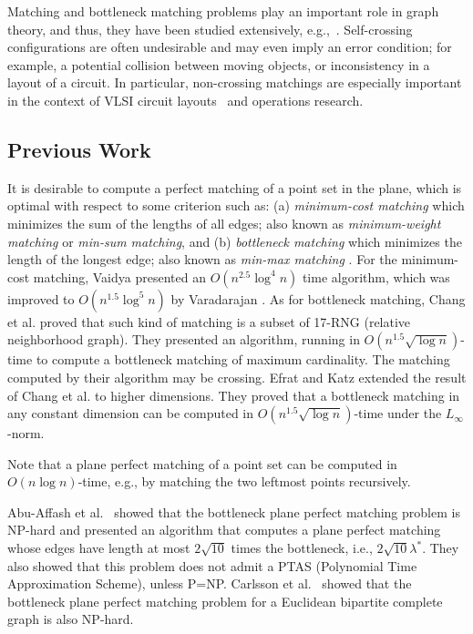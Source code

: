 \documentclass[11pt,a4paper]{article}
\newcommand{\btopt}{\lambda^*}
\begin{document}
Matching and bottleneck matching problems play an important role in graph theory, and thus, they have been studied extensively,  e.g.,~\cite{Abu-Affash2014, Aloupis2013, Chang1992, Efrat2001, Efrat2000, Vaidya1989, Varadarajan1998}. Self-crossing configurations are often undesirable and may even imply an error condition; for example, a potential collision between moving objects, or inconsistency in a layout of a circuit.
In particular, non-crossing matchings are especially important in the context of VLSI circuit layouts~\cite{Lengauer1990} and operations research.


\subsection{Previous Work}

It is desirable to compute a perfect matching of a point set in the plane, which is optimal with respect to some criterion such as: (a) {\em minimum-cost matching} which minimizes the sum of the lengths of all edges; also known as {\em minimum-weight matching} or {\em min-sum matching}, and (b) {\em bottleneck matching} which minimizes the length of the longest edge; also known as {\em min-max matching} \cite{Efrat2000}. For the minimum-cost matching, Vaidya \cite{Vaidya1989} presented an $O(n^{2.5}\log^4 n)$ time algorithm, which was improved to $O(n^{1.5}\log^5 n)$ by Varadarajan \cite{Varadarajan1998}. As for bottleneck matching, Chang et al. \cite{Chang1992} proved that such kind of matching is a subset of 17-RNG (relative neighborhood graph). They presented an algorithm, running in $O(n^{1.5}\sqrt{\log n})$-time to compute a bottleneck matching of maximum cardinality. The matching computed by their algorithm may be crossing.
Efrat and Katz \cite{Efrat2000} extended the result of Chang et al. \cite{Chang1992} to higher dimensions. They proved that a bottleneck matching in any constant dimension can be computed in $O(n^{1.5}\sqrt{\log n})$-time under the $L_\infty$-norm. 

Note that a plane perfect matching of a point set can be computed in $O(n\log n)$-time, e.g., by matching the two leftmost points recursively.

Abu-Affash et al.~\cite{Abu-Affash2014} showed that the bottleneck plane perfect matching problem is NP-hard and presented an algorithm that computes a plane perfect matching whose edges have length at most $2\sqrt{10}$ times the bottleneck, i.e., $2\sqrt{10}\btopt$. They also showed that this problem does not
admit a PTAS (Polynomial Time Approximation Scheme), unless P=NP. Carlsson et al.~\cite{Carlsson2010} showed that the bottleneck plane perfect matching problem for a Euclidean bipartite complete graph is also NP-hard.
\end{document}

